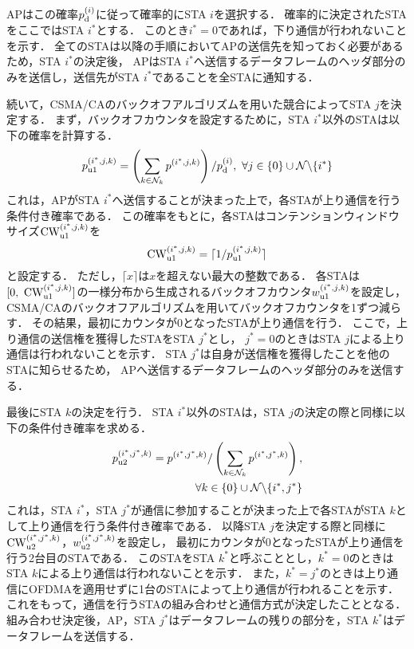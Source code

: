 \documentclass[technicalreport]{ieicej}
\newcommand{\mthnk}{{\mathcal N}_k}
\begin{document}
		APはこの確率$p_{\rm d}^{(i)}$に従って確率的にSTA $i$を選択する．
		確率的に決定されたSTAをここではSTA $i^*$とする．
		このとき$i^*=0$であれば，下り通信が行われないことを示す．
		全てのSTAは以降の手順においてAPの送信先を知っておく必要があるため，STA $i^*$の決定後，
		APはSTA $i^*$へ送信するデータフレームのヘッダ部分のみを送信し，送信先がSTA $i^*$であることを全STAに通知する．
		\par
		続いて，CSMA/CAのバックオフアルゴリズムを用いた競合によってSTA $j$を決定する．
		まず，バックオフカウンタを設定するために，STA $i^*$以外のSTAは以下の確率を計算する．
		\begin{align}
			p_{\rm u1}^{(i^*,j,k)}=\left(\sum_{k\in\mthnk} p^{(i^*,j,k)}\right) / p_{\rm d}^{(i)},\ \forall j \in \{0\}\cup{\mathcal N}\backslash \{i^*\}
		\end{align}
		これは，APがSTA $i^*$へ送信することが決まった上で，各STAが上り通信を行う条件付き確率である．
		この確率をもとに，各STAはコンテンションウィンドウサイズ${\rm CW}^{(i^*,j,k)}_{\rm u1}$を
		\begin{equation}
			{\rm CW}^{(i^*,j,k)}_{\rm u1} = \lceil 1/p_{\rm u1}^{(i^*,j,k)} \rceil
		\end{equation}
		と設定する．
		ただし，$\lceil x \rceil$は$x$を超えない最大の整数である．
		各STAは$[0,\ {\rm CW}^{(i^*,j,k)}_{\rm u1}]$の一様分布から生成されるバックオフカウンタ$w_{\rm u1}^{(i^*,j,k)}$を設定し，
		CSMA/CAのバックオフアルゴリズムを用いてバックオフカウンタを1ずつ減らす．
		その結果，最初にカウンタが0となったSTAが上り通信を行う．
		ここで，上り通信の送信権を獲得したSTAをSTA $j^*$とし，
		$j^*=0$のときはSTA $j$による上り通信は行われないことを示す．
		STA $j^*$は自身が送信権を獲得したことを他のSTAに知らせるため，
		APへ送信するデータフレームのヘッダ部分のみを送信する．
		\par
		最後にSTA $k$の決定を行う．
		STA $i^*$以外のSTAは，STA $j$の決定の際と同様に以下の条件付き確率を求める．
		\begin{align}
			p_{\rm u2}^{(i^*,j^*,k)}=p^{(i^*,j^*,k)} / \left(\sum_{k\in\mthnk} p^{(i^*,j^*,k)}\right), \nonumber\\
			\qquad\qquad\forall k \in \{0\}\cup{\mathcal N}\backslash \{i^*,j^*\}
		\end{align}
		これは，STA $i^*$，STA $j^*$が通信に参加することが決まった上で各STAがSTA $k$として上り通信を行う条件付き確率である．
		以降STA $j$を決定する際と同様に${\rm CW}^{(i^*,j^*,k)}_{\rm u2}$，$w_{\rm u2}^{(i^*,j^*,k)}$を設定し，
		最初にカウンタが0となったSTAが上り通信を行う2台目のSTAである．
		このSTAをSTA $k^*$と呼ぶこととし，$k^*=0$のときはSTA $k$による上り通信は行われないことを示す．
		また，$k^*=j^*$のときは上り通信にOFDMAを適用せずに1台のSTAによって上り通信が行われることを示す．
		これをもって，通信を行うSTAの組み合わせと通信方式が決定したこととなる．
		組み合わせ決定後，AP，STA $j^*$はデータフレームの残りの部分を，STA $k^*$はデータフレームを送信する．
\end{document}
